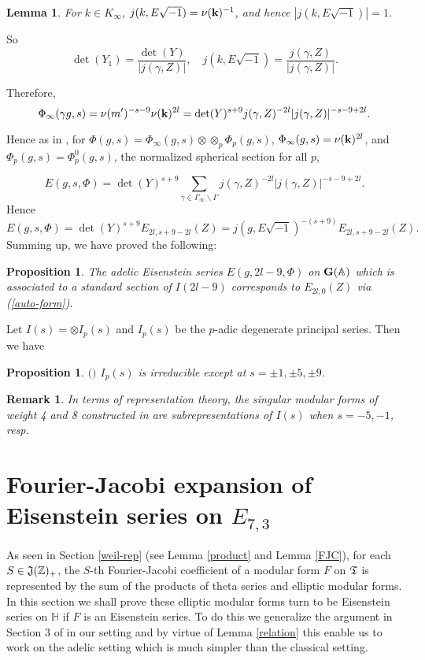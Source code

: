 \documentclass[11pt]{amsart}
\numberwithin{equation}{section}
\newtheorem{prop}[theorem]{Proposition}
\newtheorem{remark}[theorem]{Remark}
\newtheorem{lemma}[theorem]{Lemma}
\theoremstyle{definition}
\begin{document}
\begin{lemma} For $k\in K_\infty$, $j(k,E\sqrt{-1})=\nu(\bold k)^{-1}$, and hence $|j(k,E\sqrt{-1})|=1$.
\end{lemma}

So
$$
\det(Y_1)=\frac {\det(Y)}{|j(\gamma,Z)|},\quad j(k,E\sqrt{-1})=\frac {j(\gamma,Z)}{|j(\gamma,Z)|}.
$$

Therefore,
$$\Phi_\infty(\gamma g, s)=\nu(m')^{-s-9} \nu(\bold k)^{2l}=\det(Y)^{s+9}j(\gamma,Z)^{-2l}|j(\gamma,Z)|^{-s-9+2l}.
$$

Hence as in \cite{Ku}, for $\Phi(g, s)=\Phi_\infty(g, s)\otimes \otimes_p \Phi_p(g, s)$, $\Phi_\infty(g, s)=\nu(\bold k)^{2l}$, and $\Phi_p(g,s)=\Phi_p^0(g,s)$, the normalized spherical section for all $p$,

$$E(g,s,\Phi)=\det(Y)^{s+9} \sum_{\gamma\in \Gamma_\infty\backslash \Gamma} j(\gamma,Z)^{-2l}|j(\gamma,Z)|^{-s-9+2l}.
$$
Hence
$$E(g,s,\Phi)=\det(Y)^{s+9} E_{2l,s+9-2l}(Z)=j(g,E\sqrt{-1})^{-(s+9)}E_{2l,s+9-2l}(Z).
$$
Summing up, we have proved the following:
\begin{prop}\label{adelic-Eisen} The adelic Eisenstein series $E(g,2l-9,\Phi)$ on $\bold{G}({\mathbb{A}})$ which is associated to a standard section of  
$I(2l-9)$ corresponds to $E_{2l,0}(Z)$ via (\ref{auto-form}). 
\end{prop} 

Let $I(s)=\otimes I_p(s)$ and $I_p(s)$ be the $p$-adic degenerate principal series. Then we have

\begin{prop}\label{W}$($\cite{W}$)$ $I_p(s)$ is irreducible except at $s=\pm 1, \pm 5, \pm 9$.
\end{prop}

\begin{remark} In terms of representation theory, the singular modular forms of weight 4 and 8 constructed in \cite{kim} are subrepresentations of $I(s)$ when $s=-5, -1$, resp.
\end{remark}

\section{Fourier-Jacobi expansion of Eisenstein series on $E_{7,3}$}
As seen in Section \ref{weil-rep} (see Lemma \ref{product} and Lemma \ref{FJC}), 
for each $S\in \frak J({\mathbb{Z}})_{+}$, the $S$-th Fourier-Jacobi coefficient of 
a modular form $F$ on $\frak T$ is represented by the sum of the products of theta series and elliptic modular forms. 
In this section we shall prove these elliptic modular forms turn to be Eisenstein series on $\mathbb{H}$ if 
$F$ is an Eisenstein series. To do this we generalize the argument in Section 3 of \cite{Ik3} in our setting and 
by virtue of Lemma \ref{relation} this enable us to work on the adelic setting which is much simpler than the classical setting.  
\end{document}
